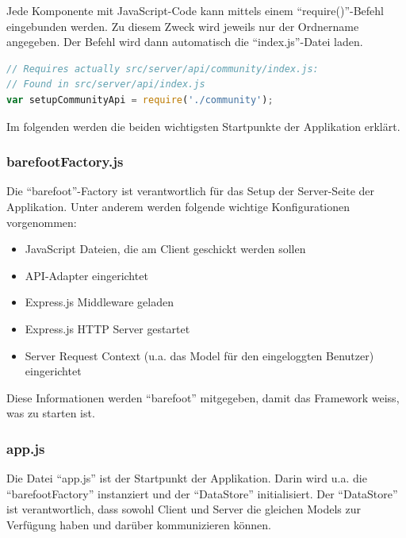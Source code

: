 Jede Komponente mit JavaScript-Code kann mittels einem ``require()''-Befehl eingebunden werden. Zu diesem Zweck wird jeweils nur der Ordnername angegeben. Der Befehl wird dann automatisch die ``index.js''-Datei laden.


\begin{lstlisting}[language=JavaScript, caption=Einbindung der Community-Komponente, float=ht!]
// Requires actually src/server/api/community/index.js:
// Found in src/server/api/index.js
var setupCommunityApi = require('./community');
\end{lstlisting}

Im folgenden werden die beiden wichtigsten Startpunkte der Applikation erklärt.

\subsubsection*{barefootFactory.js}
Die ``barefoot''-Factory \cite{barefootFactoryjs} ist verantwortlich für das Setup der Server-Seite der Applikation.
Unter anderem werden folgende wichtige Konfigurationen vorgenommen:
\begin{itemize}
	\item{JavaScript Dateien, die am Client geschickt werden sollen}
	\item{API-Adapter eingerichtet}
	\item{Express.js \cite{Expressjs} Middleware geladen}
	\item{Express.js \cite{Expressjs} HTTP Server gestartet}
	\item{Server Request Context (u.a. das Model für den eingeloggten Benutzer) eingerichtet}
\end{itemize}

Diese Informationen werden ``barefoot'' \cite{Barefoot} mitgegeben, damit das Framework weiss, was zu starten ist.

\subsubsection*{app.js}
Die Datei ``app.js'' \cite{appjs} ist der Startpunkt der Applikation.
Darin wird u.a. die ``barefootFactory'' instanziert und der ``DataStore'' initialisiert. Der ``DataStore'' ist verantwortlich, dass sowohl Client und Server die gleichen Models zur Verfügung haben und darüber kommunizieren können.
